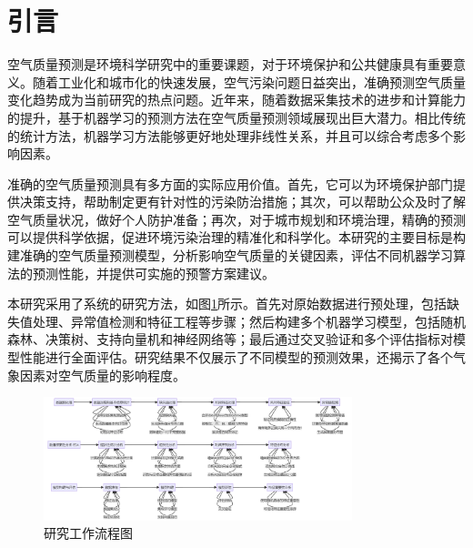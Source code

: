 \section{引言}

空气质量预测是环境科学研究中的重要课题，对于环境保护和公共健康具有重要意义\cite{zhang2020air}。随着工业化和城市化的快速发展，空气污染问题日益突出，准确预测空气质量变化趋势成为当前研究的热点问题。近年来，随着数据采集技术的进步和计算能力的提升，基于机器学习的预测方法在空气质量预测领域展现出巨大潜力\cite{kim2019hybrid}。相比传统的统计方法，机器学习方法能够更好地处理非线性关系，并且可以综合考虑多个影响因素。

准确的空气质量预测具有多方面的实际应用价值。首先，它可以为环境保护部门提供决策支持，帮助制定更有针对性的污染防治措施；其次，可以帮助公众及时了解空气质量状况，做好个人防护准备；再次，对于城市规划和环境治理，精确的预测可以提供科学依据，促进环境污染治理的精准化和科学化。本研究的主要目标是构建准确的空气质量预测模型，分析影响空气质量的关键因素，评估不同机器学习算法的预测性能，并提供可实施的预警方案建议。

本研究采用了系统的研究方法，如图\ref{fig:workflow}所示。首先对原始数据进行预处理，包括缺失值处理、异常值检测和特征工程等步骤；然后构建多个机器学习模型，包括随机森林、决策树、支持向量机和神经网络等；最后通过交叉验证和多个评估指标对模型性能进行全面评估。研究结果不仅展示了不同模型的预测效果，还揭示了各个气象因素对空气质量的影响程度。

\begin{figure}[H]
    \centering
    \includegraphics[width=0.8\textwidth]{images/export.png}
    \caption{研究工作流程图}
    \label{fig:workflow}
\end{figure} 